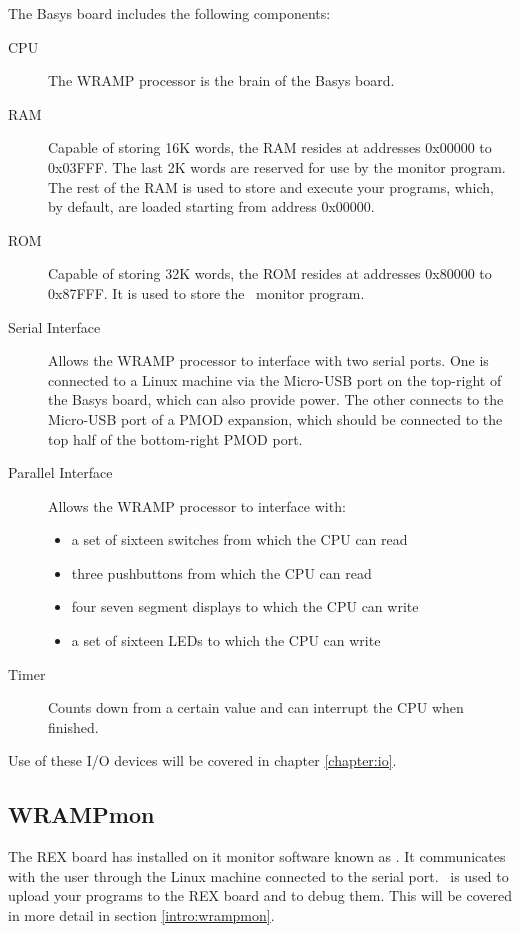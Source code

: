 The Basys board includes the following components:

\begin{description}
\item[CPU] The WRAMP processor is the brain of the Basys board.
%
\item[RAM] Capable of storing 16K words, the RAM resides at addresses 0x00000
to 0x03FFF. The last  2K words are reserved for use by the monitor program. The rest 
of the RAM is used to store and execute your programs, which, by default, are 
loaded starting from address 0x00000.
%
\item[ROM] Capable of storing 32K words, the ROM resides at addresses 
0x80000 to 0x87FFF. It is used to store the \WRAMPmon\ monitor program.
%
\item[Serial Interface] Allows the WRAMP processor to interface with two serial
ports. One is connected to a Linux machine via the Micro-USB port on the top-right
of the Basys board, which can also provide power. The other connects to the Micro-USB
port of a PMOD expansion, which should be connected to the top half of the 
bottom-right PMOD port.
%
\item[Parallel Interface] Allows the WRAMP processor to interface with: 
\begin{itemize}
\item a set of sixteen switches from which the CPU can read
\item three pushbuttons from which the CPU can read
\item four seven segment displays to which the CPU can write
\item a set of sixteen LEDs to which the CPU can write
\end{itemize}
\item[Timer] Counts down from a certain value and can interrupt the CPU when 
finished.
%
\end{description}
Use of these I/O devices will be covered in chapter \ref{chapter:io}.


\subsection{WRAMPmon}
The REX board has installed on it monitor software known as \WRAMPmon.
It communicates with the user through the Linux machine connected to
the serial port. \WRAMPmon\ is used to upload your programs to the REX
board and to debug them.  This will be covered in more detail in
section \ref{intro:wrampmon}.
%
%
%
